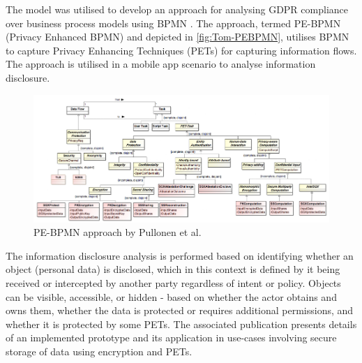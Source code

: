 The model was utilised to develop an approach for analysing GDPR compliance over business process models using BPMN \cite{pullonen_privacy-enhanced_2019}.
The approach, termed PE-BPMN (Privacy Enhanced BPMN) and depicted in \autoref{fig:Tom-PEBPMN}, utilises BPMN to capture Privacy Enhancing Techniques (PETs) for capturing information flows. The approach is utilised in a mobile app scenario to analyse information disclosure.
\begin{figure}[htbp]
    \centering
    \includegraphics[width=\linewidth]{img/Tom_PEBPMN.png}
    \caption{PE-BPMN approach by Pullonen et al. \cite{pullonen_privacy-enhanced_2019}}
    \label{fig:Tom-PEBPMN}
\end{figure}

The information disclosure analysis is performed based on identifying whether an object (personal data) is disclosed, which in this context is defined by it being received or intercepted by another party regardless of intent or policy. Objects can be visible, accessible, or hidden - based on whether the actor obtains and owns them, whether the data is protected or requires additional permissions, and whether it is protected by some PETs. The associated publication \cite{pullonen_privacy-enhanced_2019} presents details of an implemented prototype and its application in use-cases involving secure storage of data using encryption and PETs. 

